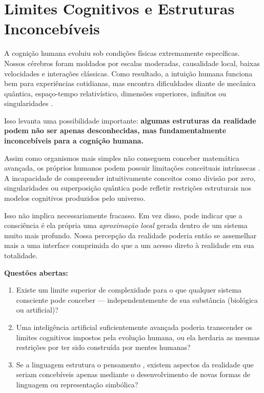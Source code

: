 \documentclass[12pt,a4paper]{article}
\begin{document}
\section{Limites Cognitivos e Estruturas Inconcebíveis}

A cognição humana evoluiu sob condições físicas extremamente específicas.
Nossos cérebros foram moldados por escalas moderadas, causalidade local,
baixas velocidades e interações clássicas. Como resultado, a intuição humana
funciona bem para experiências cotidianas, mas encontra dificuldades diante
de mecânica quântica, espaço-tempo relativístico, dimensões superiores,
infinitos ou singularidades \citep{kahneman2011}.

Isso levanta uma possibilidade importante: \textbf{algumas estruturas da
realidade podem não ser apenas desconhecidas, mas fundamentalmente
inconcebíveis para a cognição humana.}

Assim como organismos mais simples não conseguem conceber matemática
avançada, os próprios humanos podem possuir limitações conceituais
intrínsecas \citep{chomsky2000}. A incapacidade de compreender intuitivamente
conceitos como divisão por zero, singularidades ou superposição quântica
pode refletir restrições estruturais nos modelos cognitivos produzidos
pelo universo.

Isso não implica necessariamente fracasso. Em vez disso, pode indicar que
a consciência é ela própria uma \textit{aproximação local} gerada dentro
de um sistema muito mais profundo. Nossa percepção da realidade poderia
então se assemelhar mais a uma interface comprimida \citep{hoffman2019}
do que a um acesso direto à realidade em sua totalidade.

\begin{tcolorbox}[questionbox]
  \textbf{Questões abertas:}
  \begin{enumerate}
    \item Existe um limite superior de complexidade para o que qualquer
      sistema consciente pode conceber — independentemente de sua
      substância (biológica ou artificial)?
    \item Uma inteligência artificial suficientemente avançada poderia
      transcender os limites cognitivos impostos pela evolução humana,
      ou ela herdaria as mesmas restrições por ter sido construída
      por mentes humanas?
    \item Se a linguagem estrutura o pensamento \citep{whorf1956},
      existem aspectos da realidade que seriam concebíveis apenas
      mediante o desenvolvimento de novas formas de linguagem ou
      representação simbólica?
  \end{enumerate}
\end{tcolorbox}
\end{document}
